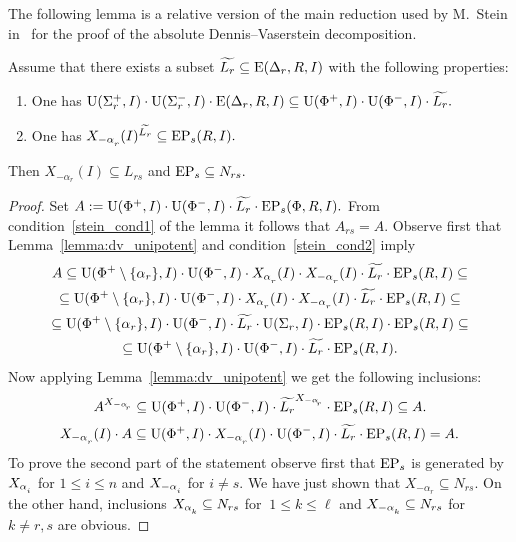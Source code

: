 The following lemma is a relative version of the main reduction used by M.~Stein in~\cite{St78} for the proof of the absolute Dennis--Vaserstein decomposition.
\begin{lemma}\label{lemma:Stein_reduction}
Assume that there exists a subset $\widetilde{L_r} \subseteq \operatorname{E}(\Delta_r, R, I)$ with the following properties:
\begin{enumerate}[label=(\alph*)] 
 \item\label{stein_cond1} One has $\operatorname{U}(\Sigma^+_r, I)\cdot \operatorname{U}(\Sigma^-_r, I) \cdot \operatorname{E}(\Delta_r, R, I) \subseteq \operatorname{U}(\Phi^+, I)\cdot \operatorname{U}(\Phi^-, I) \cdot \widetilde{L_r}.$
 \item\label{stein_cond2} One has $X_{-\alpha\ssub{r}}(I)^{\widetilde{L_r}} \subseteq \EP_s(R, I).$
\end{enumerate}
Then $X_{-\alpha_r}(I) \subseteq L_{rs}$ and $\operatorname{EP}_s \subseteq N_{rs}.$
\end{lemma}
\begin{proof} Set $A:=\operatorname{U}(\Phi^+, I)\cdot \operatorname{U}(\Phi^-, I) \cdot \widetilde{L_r} \cdot \operatorname{EP}_s(\Phi, R, I).$
From condition~\ref{stein_cond1} of the lemma it follows that $A_{rs}=A$.
Observe first that Lemma~\ref{lemma:dv_unipotent} and condition~\ref{stein_cond2} imply
\begin{multline}\nonumber 
A \subseteq \U(\Phi^+\setminus \{\alpha_r\}, I) \cdot \U(\Phi^-, I) \cdot X_{\alpha\ssub{r}}(I) \cdot X_{-\alpha\ssub{r}}(I) \cdot \widetilde{L_r} \cdot \EP_s(R, I) \subseteq \\ 
\subseteq \U(\Phi^+\setminus\{\alpha_r\}, I) \cdot \U(\Phi^-, I) \cdot X_{\alpha\ssub{r}}(I) \cdot X_{-\alpha\ssub{r}}(I) \cdot \widetilde{L_r} \cdot \EP_s(R, I) \subseteq \\
\subseteq \U(\Phi^+\setminus\{\alpha_r\}, I) \cdot \U(\Phi^-, I) \cdot \widetilde{L_r} \cdot \U(\Sigma_r, I) \cdot \EP_s(R, I)  \cdot \EP_s(R, I) \subseteq \\
\subseteq \U(\Phi^+\setminus\{\alpha_r\}, I) \cdot \U(\Phi^-, I) \cdot \widetilde{L_r} \cdot \EP_s(R, I). \end{multline}
Now applying Lemma~\ref{lemma:dv_unipotent} we get the following inclusions:
\begin{equation}\nonumber A^{X_{-\alpha\ssub{r}}} \subseteq \U(\Phi^+, I) \cdot \U(\Phi^-, I) \cdot \widetilde{L_r} ^{X_{-\alpha\ssub{r}}} \cdot \EP_s(R, I) \subseteq A. \end{equation}
\begin{equation}\nonumber X_{-\alpha\ssub{r}}(I) \cdot A \subseteq \U(\Phi^+, I) \cdot X_{-\alpha\ssub{r}}(I) \cdot \U(\Phi^-, I) \cdot \widetilde{L_r} \cdot \EP_s(R, I) = A. \end{equation}
To prove the second part of the statement observe first that $\operatorname{EP}_s$ is generated by $X_{\alpha\ssub{i}}$ for $1\leq i\leq n$ and $X_{-\alpha\ssub{i}}$ for $i\neq s$.
We have just shown that $X_{-\alpha_r}\subseteq N_{rs}$.
On the other hand, inclusions $X_{\alpha\ssub{k}} \subseteq N_{rs}$ for $\ 1\leq k\leq \ell$ and $X_{-\alpha\ssub{k}} \subseteq N_{rs}$ for $k\neq r,s$ are obvious.
\end{proof}

